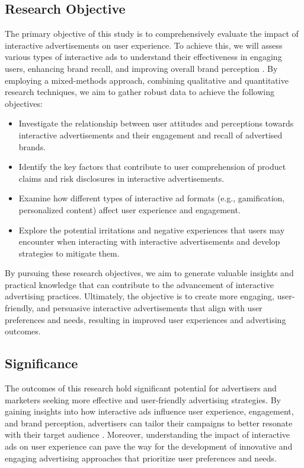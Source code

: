\documentclass[journal]{IEEEtran}
\begin{document}
\subsection{Research Objective}
The primary objective of this study is to comprehensively evaluate the impact of
interactive advertisements on user experience. To achieve this, we will assess various types
of interactive ads to understand their effectiveness in engaging users, enhancing brand recall,
and improving overall brand perception \cite{giombi2022impact}. By employing a mixed-methods approach,
combining qualitative and quantitative research techniques, we aim to gather robust data
to achieve the following objectives:
\begin{itemize}
    \item Investigate the relationship between user attitudes and perceptions towards interactive advertisements and their engagement and recall of advertised brands.
    \item Identify the key factors that contribute to user comprehension of product claims and risk disclosures in interactive advertisements.
    \item Examine how different types of interactive ad formats (e.g., gamification, personalized content) affect user experience and engagement.
    \item Explore the potential irritations and negative experiences that users may encounter when interacting with interactive advertisements and develop strategies to mitigate them.
\end{itemize}
By pursuing these research objectives, we aim to generate valuable insights and practical knowledge that can contribute to the advancement of
interactive advertising practices. Ultimately, the objective is to create more engaging, user-friendly, and
persuasive interactive advertisements that align with user preferences and needs, resulting in improved user experiences and advertising outcomes.


\subsection{Significance}
The outcomes of this research hold significant potential for advertisers and marketers
seeking more effective and user-friendly advertising strategies. By gaining insights into
how interactive ads influence user experience, engagement, and brand perception, advertisers
can tailor their campaigns to better resonate with their target audience \cite{sundar2008main}.
Moreover, understanding the impact of interactive ads on user experience can pave the way
for the development of innovative and engaging advertising approaches that prioritize user preferences and needs.
\end{document}
